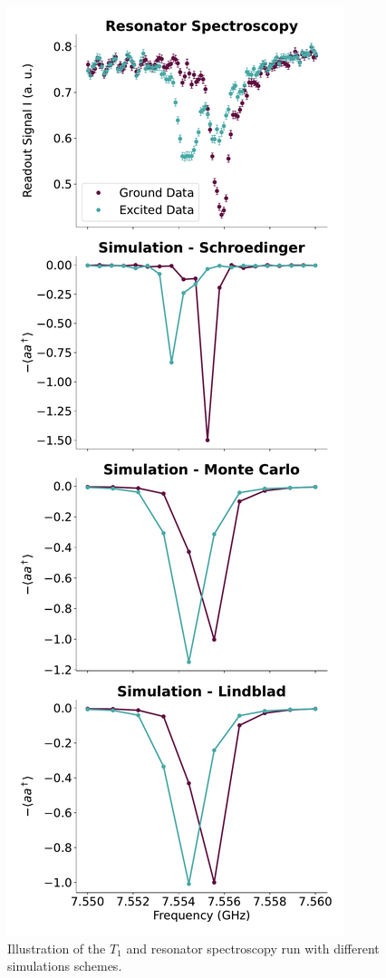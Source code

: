 \begin{figure}[h]
\begin{minipage}{0.49\textwidth}
    \end{minipage}
        \begin{minipage}{0.49\textwidth}
        \centering
        \includegraphics[]{Simulations/simulations_of_calibrations/Figs/resonator_spectroscopy.pdf}
    \end{minipage}
    \caption{Illustration of the $T_1$ and resonator spectroscopy run with different simulations schemes.}
    \label{fig:calibrations_in_simulation}
\end{figure}



